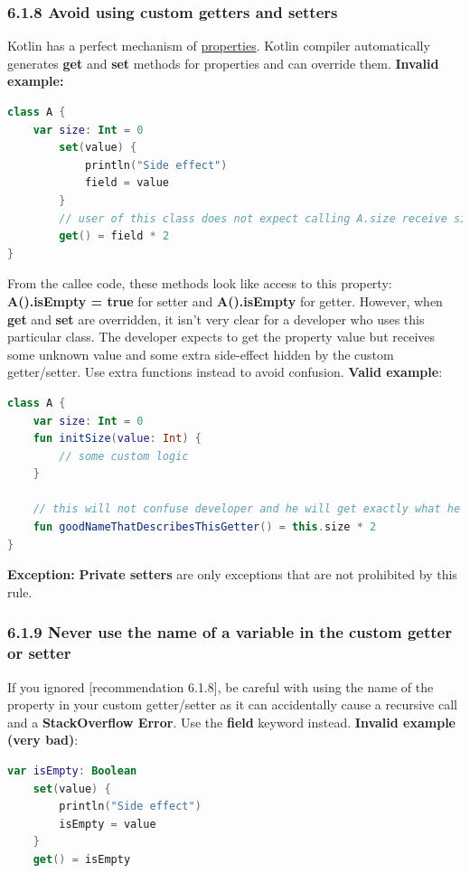 \subsubsection*{\textbf{6.1.8 Avoid using custom getters and setters}}
\leavevmode\newline
\label{sec:6.1.8}
Kotlin has a perfect mechanism of \href{https://kotlinlang.org/docs/reference/properties.html#properties-and-fields}{properties}.
Kotlin compiler automatically generates \textbf{get} and \textbf{set} methods for properties and can override them.
\textbf{Invalid example:}
\begin{lstlisting}[language=Kotlin]
class A {
    var size: Int = 0
        set(value) {
            println("Side effect")
            field = value
        }
        // user of this class does not expect calling A.size receive size * 2
        get() = field * 2
}
\end{lstlisting}
From the callee code, these methods look like access to this property: \textbf{A().isEmpty = true} for setter and \textbf{A().isEmpty} for getter.
However, when \textbf{get} and \textbf{set} are overridden, it  isn't very clear for a developer who uses this particular class.
The developer expects to get the property value but receives some unknown value and some extra side-effect hidden by the custom getter/setter.
Use extra functions instead to avoid confusion.
\textbf{Valid example}:
\begin{lstlisting}[language=Kotlin]
class A {
    var size: Int = 0
    fun initSize(value: Int) {
        // some custom logic
    }

    // this will not confuse developer and he will get exactly what he expects
    fun goodNameThatDescribesThisGetter() = this.size * 2
}
\end{lstlisting}
\textbf{Exception:} \textbf{Private setters} are only exceptions that are not prohibited by this rule.
\subsubsection*{\textbf{6.1.9 Never use the name of a variable in the custom getter or setter}}
\leavevmode\newline
\label{sec:6.1.9}
If you ignored [recommendation 6.1.8], be careful with using the name of the property in your custom getter/setter
as it can accidentally cause a recursive call and a \textbf{StackOverflow Error}. Use the \textbf{field} keyword instead.
\textbf{Invalid example (very bad)}:
\begin{lstlisting}[language=Kotlin]
var isEmpty: Boolean
    set(value) {
        println("Side effect")
        isEmpty = value
    }
    get() = isEmpty
\end{lstlisting}
